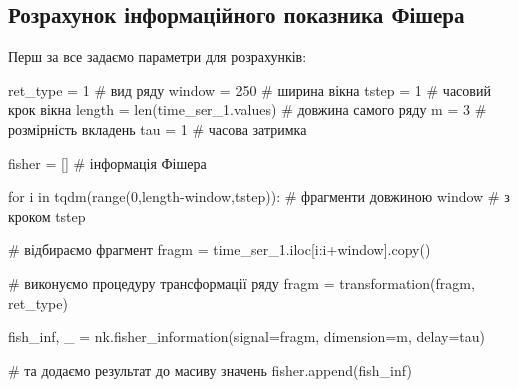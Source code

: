 \documentclass[
  letterpaper,
]{report}
\newenvironment{Shaded}{\begin{snugshade}}{\end{snugshade}}
\newcommand{\BuiltInTok}[1]{\textcolor[rgb]{0.00,0.23,0.31}{#1}}
\newcommand{\CommentTok}[1]{\textcolor[rgb]{0.37,0.37,0.37}{#1}}
\newcommand{\ControlFlowTok}[1]{\textcolor[rgb]{0.00,0.23,0.31}{#1}}
\newcommand{\DecValTok}[1]{\textcolor[rgb]{0.68,0.00,0.00}{#1}}
\newcommand{\KeywordTok}[1]{\textcolor[rgb]{0.00,0.23,0.31}{#1}}
\newcommand{\NormalTok}[1]{\textcolor[rgb]{0.00,0.23,0.31}{#1}}
\newcommand{\OperatorTok}[1]{\textcolor[rgb]{0.37,0.37,0.37}{#1}}
\begin{document}
\hypertarget{ux440ux43eux437ux440ux430ux445ux443ux43dux43eux43a-ux456ux43dux444ux43eux440ux43cux430ux446ux456ux439ux43dux43eux433ux43e-ux43fux43eux43aux430ux437ux43dux438ux43aux430-ux444ux456ux448ux435ux440ux430}{%
\subsection{Розрахунок інформаційного показника
Фішера}\label{ux440ux43eux437ux440ux430ux445ux443ux43dux43eux43a-ux456ux43dux444ux43eux440ux43cux430ux446ux456ux439ux43dux43eux433ux43e-ux43fux43eux43aux430ux437ux43dux438ux43aux430-ux444ux456ux448ux435ux440ux430}}

Перш за все задаємо параметри для розрахунків:

\begin{Shaded}
\begin{Highlighting}[]
\NormalTok{ret\_type }\OperatorTok{=} \DecValTok{1}                      \CommentTok{\# вид ряду}
\NormalTok{window }\OperatorTok{=} \DecValTok{250}                      \CommentTok{\# ширина вікна}
\NormalTok{tstep }\OperatorTok{=} \DecValTok{1}                         \CommentTok{\# часовий крок вікна }
\NormalTok{length }\OperatorTok{=} \BuiltInTok{len}\NormalTok{(time\_ser\_1.values)   }\CommentTok{\# довжина самого ряду  }
\NormalTok{m }\OperatorTok{=} \DecValTok{3}                             \CommentTok{\# розмірність вкладень}
\NormalTok{tau }\OperatorTok{=} \DecValTok{1}                           \CommentTok{\# часова затримка}

\NormalTok{fisher }\OperatorTok{=}\NormalTok{ []                       }\CommentTok{\# інформація Фішера}
\end{Highlighting}
\end{Shaded}

\begin{Shaded}
\begin{Highlighting}[]
\ControlFlowTok{for}\NormalTok{ i }\KeywordTok{in}\NormalTok{ tqdm(}\BuiltInTok{range}\NormalTok{(}\DecValTok{0}\NormalTok{,length}\OperatorTok{{-}}\NormalTok{window,tstep)):       }\CommentTok{\# фрагменти довжиною window  }
                                                   \CommentTok{\# з кроком tstep}

    \CommentTok{\# відбираємо фрагмент}
\NormalTok{    fragm }\OperatorTok{=}\NormalTok{ time\_ser\_1.iloc[i:i}\OperatorTok{+}\NormalTok{window].copy()   }

    \CommentTok{\# виконуємо процедуру трансформації ряду }
\NormalTok{    fragm }\OperatorTok{=}\NormalTok{ transformation(fragm, ret\_type)}

\NormalTok{    fish\_inf, \_ }\OperatorTok{=}\NormalTok{ nk.fisher\_information(signal}\OperatorTok{=}\NormalTok{fragm,}
\NormalTok{                                        dimension}\OperatorTok{=}\NormalTok{m, }
\NormalTok{                                        delay}\OperatorTok{=}\NormalTok{tau) }

    \CommentTok{\# та додаємо результат до масиву значень}
\NormalTok{    fisher.append(fish\_inf)}
\end{Highlighting}
\end{Shaded}
\end{document}
